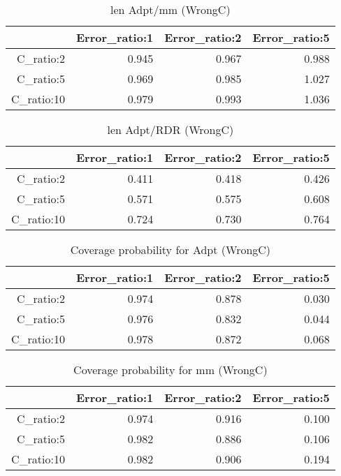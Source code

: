 \begin{table}[ht]
\centering
\begin{tabular}{rrrr}
  \hline
 & Error\_ratio:1 & Error\_ratio:2 & Error\_ratio:5 \\ 
  \hline
C\_ratio:2 & 0.945 & 0.967 & 0.988 \\ 
  C\_ratio:5 & 0.969 & 0.985 & 1.027 \\ 
  C\_ratio:10 & 0.979 & 0.993 & 1.036 \\ 
   \hline
\end{tabular}
\caption{len Adpt/mm (WrongC)} 
\end{table}
\begin{table}[ht]
\centering
\begin{tabular}{rrrr}
  \hline
 & Error\_ratio:1 & Error\_ratio:2 & Error\_ratio:5 \\ 
  \hline
C\_ratio:2 & 0.411 & 0.418 & 0.426 \\ 
  C\_ratio:5 & 0.571 & 0.575 & 0.608 \\ 
  C\_ratio:10 & 0.724 & 0.730 & 0.764 \\ 
   \hline
\end{tabular}
\caption{len Adpt/RDR (WrongC)} 
\end{table}
\begin{table}[ht]
\centering
\begin{tabular}{rrrr}
  \hline
 & Error\_ratio:1 & Error\_ratio:2 & Error\_ratio:5 \\ 
  \hline
C\_ratio:2 & 0.974 & 0.878 & 0.030 \\ 
  C\_ratio:5 & 0.976 & 0.832 & 0.044 \\ 
  C\_ratio:10 & 0.978 & 0.872 & 0.068 \\ 
   \hline
\end{tabular}
\caption{Coverage probability for Adpt (WrongC)} 
\end{table}
\begin{table}[ht]
\centering
\begin{tabular}{rrrr}
  \hline
 & Error\_ratio:1 & Error\_ratio:2 & Error\_ratio:5 \\ 
  \hline
C\_ratio:2 & 0.974 & 0.916 & 0.100 \\ 
  C\_ratio:5 & 0.982 & 0.886 & 0.106 \\ 
  C\_ratio:10 & 0.982 & 0.906 & 0.194 \\ 
   \hline
\end{tabular}
\caption{Coverage probability for mm (WrongC)} 
\end{table}
